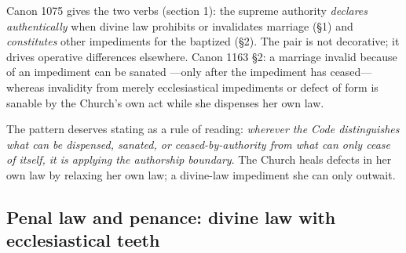 Canon 1075 gives the two verbs (section 1): the supreme authority \emph{declares authentically} when divine law prohibits or invalidates marriage (§1) and \emph{constitutes} other impediments for the baptized (§2). The pair is not decorative; it drives operative differences elsewhere. Canon 1163 §2: a marriage invalid because of an impediment  can be sanated ---only after the impediment has ceased---whereas invalidity from merely ecclesiastical impediments or defect of form is sanable by the Church's own act while she dispenses her own law.

The pattern deserves stating as a rule of reading: \emph{wherever the Code distinguishes what can be dispensed, sanated, or ceased-by-authority from what can only cease of itself, it is applying the authorship boundary}. The Church heals defects in her own law by relaxing her own law; a divine-law impediment she can only outwait.

\subsection{Penal law and penance: divine law with ecclesiastical teeth}

